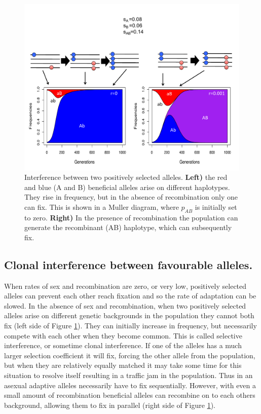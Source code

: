 \begin{figure}
\begin{center}
  \includegraphics[width = 0.8 \textwidth]{figures/selection_recom_interaction/Interference_w_haps.pdf}
\end{center}
\caption{Interference between two positively selected alleles. {\bf Left)} the red and blue (A and B) beneficial alleles arise on different haplotypes. They rise in frequency, but in the absence of recombination only one can fix. This is shown in a Muller diagram, where $p_{AB}$ is initially set to zero. {\bf Right)} In the presence of recombination the population can generate the recombinant (AB) haplotype, which can subsequently fix. } \label{fig:Interference}  %
\end{figure}
\subsection{Clonal interference between favourable alleles.}
When rates of sex and recombination are zero, or very low, positively selected alleles can prevent each other reach fixation and so the rate of adaptation can be slowed.
In the absence of sex and recombination, when two positively selected alleles arise on different genetic backgrounds in the population they cannot both fix (left side of Figure \ref{fig:Interference}). They can initially increase in frequency, but necessarily compete with each other when they become common. This is called selective interference, or sometime clonal interference. If one of the alleles has a much larger selection coefficient it will fix, forcing the other allele from the population, but when they are relatively equally matched it may take some time for this situation to resolve itself resulting in a traffic jam in the population. Thus in an asexual adaptive alleles necessarily have to fix sequentially. However, with even a small amount of recombination beneficial alleles can recombine on to each others background, allowing them to fix in parallel (right side of  Figure \ref{fig:Interference}).   


